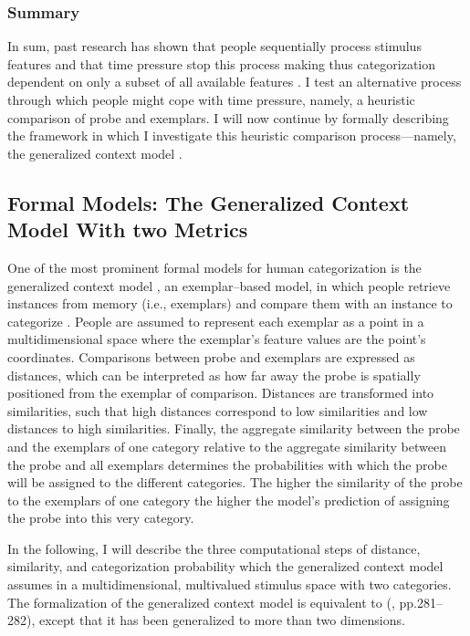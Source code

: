 \documentclass[a4paper,man,natbib]{apa6}
\begin{document}
\subsubsection{Summary}
In sum, past research has shown that people sequentially process stimulus features and that time pressure stop this process making thus categorization dependent on only a subset of all available features \citep{lamberts1995categorization, lamberts1998time, lamberts1999building, lamberts1999categorization, lamberts1997fast}. I test an alternative process through which people might cope with time pressure, namely, a heuristic comparison of probe and exemplars. I will now continue by formally describing the framework in which I investigate this heuristic comparison process---namely, the generalized context model \citep{nosofsky1986attention}.

\subsection{Formal Models: The Generalized Context Model With two Metrics}
One of the most prominent formal models for human categorization is the generalized context model \citep{nosofsky1984choice, nosofsky1986attention, nosofsky2011generalized}, an exemplar--based model, in which people retrieve instances from memory (i.e., exemplars) and compare them with an instance to categorize \citep[i.e., the probe; see also][]{medin1978context}. People are assumed to represent each exemplar as a point in a multidimensional space where the exemplar's feature values are the point's coordinates. Comparisons between probe and exemplars are expressed as distances, which can be interpreted as how far away the probe is spatially positioned from the exemplar of comparison. Distances are transformed into similarities, such that high distances correspond to low similarities and low distances to high similarities. Finally, the aggregate similarity between the probe and the exemplars of one category relative to the aggregate similarity between the probe and all exemplars determines the probabilities with which the probe will be assigned to the different categories. The higher the similarity of the probe to the exemplars of one category the higher the model's prediction of assigning the probe into this very category. 

In the following, I will describe the three computational steps of distance, similarity, and categorization probability which the generalized context model assumes in a multidimensional, multivalued stimulus space with two categories. The formalization of the generalized context model is equivalent to \citeauthor{nosofsky1989further} (\citeyear{nosofsky1989further}, pp.281--282), except that it has been generalized to more than two dimensions. 
\end{document}
